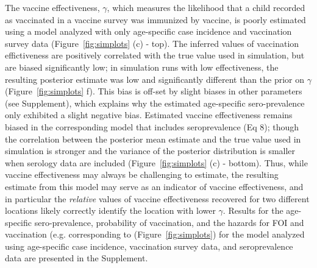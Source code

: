 \documentclass[nofootinbib,aps,pre,twocolumn,superscriptaddress,showkeys,showpacs]{revtex4-1}
\begin{document}
The vaccine effectiveness, $\gamma$, which measures the likelihood that a child recorded as vaccinated in a vaccine survey was immunized by vaccine, is poorly estimated using a model analyzed with only age-specific case incidence and vaccination survey data (Figure~\ref{fig:simplots} (c) - top).  The inferred values of vaccination effictiveness are positively correlated with the true value used in simulation, but are biased significantly low; in simulation runs with low effectiveness, the resulting posterior estimate was low and significantly different than the prior on $\gamma$ (Figure~\ref{fig:simplots} f).  This bias is off-set by slight biases in other parameters (see Supplement), which explains why the estimated age-specific sero-prevalence only exhibited a slight negative bias. Estimated vaccine effectiveness remains biased in the corresponding model that includes seroprevalence (Eq 8); though the correlation between the posterior mean estimate and the true value used in simulation is stronger and the variance of the posterior distribution is smaller when serology data are included (Figure~\ref{fig:simplots} (c) - bottom).  Thus, while vaccine effectiveness may always be challenging to estimate, the resulting estimate from this model may serve as an indicator of vaccine effectiveness, and in particular the \emph{relative} values of vaccine effectiveness recovered for two different locations likely correctly identify the location with lower $\gamma$.  Results for the age-specific sero-prevalence, probability of vaccination, and the hazards for FOI and vaccination (e.g. corresponding to (Figure~\ref{fig:simplots}) for the model analyzed using age-specific case incidence, vaccination survey data, and seroprevalence data are presented in the Supplement.

\end{document}
